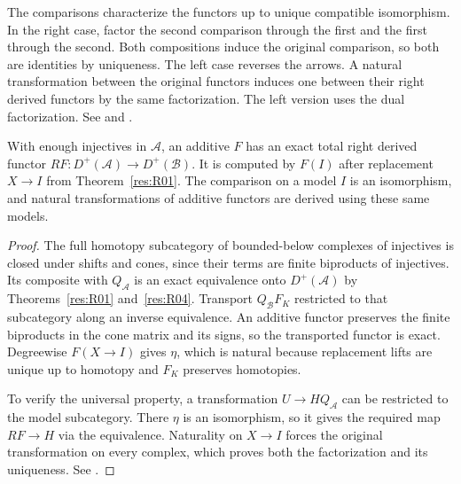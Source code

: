The comparisons characterize the functors up to unique compatible
isomorphism. In the right case, factor the second comparison through the
first and the first through the second. Both compositions induce the
original comparison, so both are identities by uniqueness. The left case
reverses the arrows. A natural transformation between the original
functors induces one between their right derived functors by the same
factorization. The left version uses the dual factorization.
See \cite[Tags 05SE, 05SV]{stacks-derived} and
\cite[Chapter 8]{yekutieli}.

\begin{theorem}\label{res:R06}
With enough injectives in \(\mathcal A\), an additive \(F\) has an
exact total right derived functor \(RF:D^+(\mathcal A)\to D^+(\mathcal B)\).
It is computed by \(F(I)\) after replacement \(X\to I\) from
Theorem~\ref{res:R01}. The comparison on a model \(I\) is an isomorphism,
and natural transformations of additive functors are derived using
these same models.
\end{theorem}
\begin{proof}
The full homotopy subcategory of bounded-below complexes of injectives
is closed under shifts and cones, since their terms are finite biproducts
of injectives. Its composite with \(Q_{\mathcal A}\) is an exact
equivalence onto \(D^+(\mathcal A)\) by Theorems~\ref{res:R01}
and~\ref{res:R04}. Transport \(Q_{\mathcal B}F_K\) restricted to that
subcategory along an inverse equivalence. An additive functor
preserves the finite biproducts in the cone matrix and its signs, so the
transported functor is exact. Degreewise \(F(X\to I)\) gives \(\eta\),
which is natural because replacement lifts are unique up to homotopy
and \(F_K\) preserves homotopies.

To verify the universal property, a transformation \(U\to H Q_{\mathcal A}\)
can be restricted to the model subcategory. There \(\eta\) is an isomorphism,
so it gives the required map \(RF\to H\) via the equivalence. Naturality
on \(X\to I\) forces the original transformation on every complex,
which proves both the factorization and its uniqueness.
See \cite[Tags 05TI, 0159]{stacks-derived}.
\end{proof}

